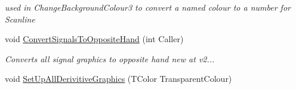 \begin{DoxyCompactItemize}
\begin{DoxyCompactList}\small\item\em used in Change\+Background\+Colour3 to convert a named colour to a number for Scanline \end{DoxyCompactList}\item 
\mbox{\label{class_t_rail_graphics_a2a9f6885adeb46f1f8825ac02eaf30b0}} 
void \mbox{\hyperlink{class_t_rail_graphics_a2a9f6885adeb46f1f8825ac02eaf30b0}{Convert\+Signals\+To\+Opposite\+Hand}} (int Caller)
\begin{DoxyCompactList}\small\item\em Converts all signal graphics to opposite hand new at v2... \end{DoxyCompactList}\item 
void \mbox{\hyperlink{class_t_rail_graphics_ae19696d461eea07c5444ed4c9714acf3}{Set\+Up\+All\+Derivitive\+Graphics}} (T\+Color Transparent\+Colour)
\end{DoxyCompactItemize}
